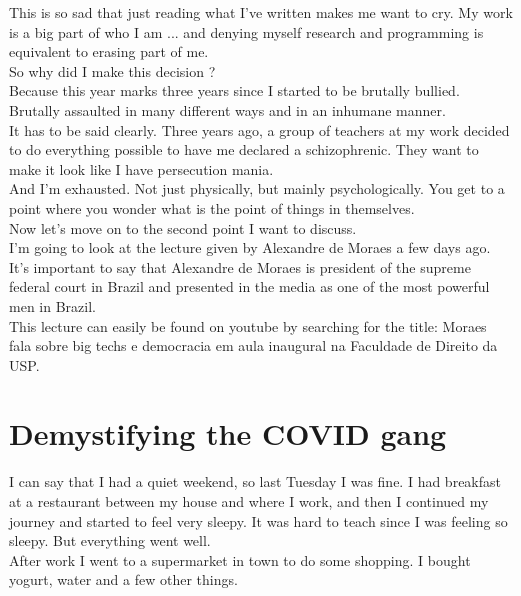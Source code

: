 \documentclass[11pt]{book}
\begin{document}
\noindent This is so sad that just reading what I've written makes me want to cry. My work is a big part of who I am ... and denying myself research and programming is equivalent to erasing part of me. \\

\noindent So why did I make this decision ? \\

\noindent Because this year marks three years since I started to be brutally bullied. Brutally assaulted in many different ways and in an inhumane manner. \\

\noindent It has to be said clearly. Three years ago, a group of teachers at my work decided to do everything possible to have me declared a schizophrenic. They want to make it look like I have persecution mania. \\

\noindent And I'm exhausted. Not just physically, but mainly psychologically. You get to a point where you wonder what is the point of things in themselves. \\

\noindent Now let's move on to the second point I want to discuss. \\

\noindent I'm going to look at the lecture given by Alexandre de Moraes a few days ago. It's important to say that Alexandre de Moraes is president of the supreme federal court in Brazil and presented in the media as one of the most powerful men in Brazil. \\

\noindent This lecture can easily be found on youtube by searching for the title: Moraes fala sobre big techs e democracia em aula inaugural na Faculdade de Direito da USP. 

\chapter{Demystifying the COVID gang}

I can say that I had a quiet weekend, so last Tuesday I was fine. I had breakfast at a restaurant between my house and where I work, and then I continued my journey and started to feel very sleepy. It was hard to teach since I was feeling so sleepy. But everything went well. \\

\noindent After work I went to a supermarket in town to do some shopping. I bought yogurt, water and a few other things. \\
\end{document}
